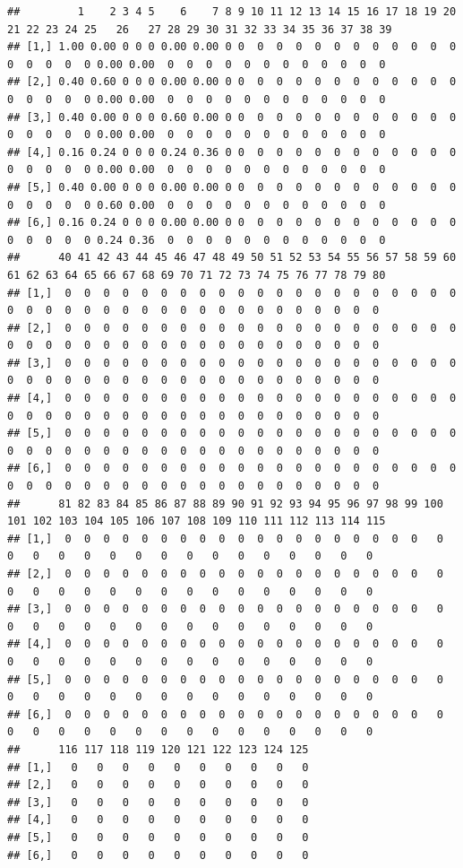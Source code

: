 \documentclass[
]{book}
\begin{document}
\begin{verbatim}
##         1    2 3 4 5    6    7 8 9 10 11 12 13 14 15 16 17 18 19 20 21 22 23 24 25   26   27 28 29 30 31 32 33 34 35 36 37 38 39
## [1,] 1.00 0.00 0 0 0 0.00 0.00 0 0  0  0  0  0  0  0  0  0  0  0  0  0  0  0  0  0 0.00 0.00  0  0  0  0  0  0  0  0  0  0  0  0
## [2,] 0.40 0.60 0 0 0 0.00 0.00 0 0  0  0  0  0  0  0  0  0  0  0  0  0  0  0  0  0 0.00 0.00  0  0  0  0  0  0  0  0  0  0  0  0
## [3,] 0.40 0.00 0 0 0 0.60 0.00 0 0  0  0  0  0  0  0  0  0  0  0  0  0  0  0  0  0 0.00 0.00  0  0  0  0  0  0  0  0  0  0  0  0
## [4,] 0.16 0.24 0 0 0 0.24 0.36 0 0  0  0  0  0  0  0  0  0  0  0  0  0  0  0  0  0 0.00 0.00  0  0  0  0  0  0  0  0  0  0  0  0
## [5,] 0.40 0.00 0 0 0 0.00 0.00 0 0  0  0  0  0  0  0  0  0  0  0  0  0  0  0  0  0 0.60 0.00  0  0  0  0  0  0  0  0  0  0  0  0
## [6,] 0.16 0.24 0 0 0 0.00 0.00 0 0  0  0  0  0  0  0  0  0  0  0  0  0  0  0  0  0 0.24 0.36  0  0  0  0  0  0  0  0  0  0  0  0
##      40 41 42 43 44 45 46 47 48 49 50 51 52 53 54 55 56 57 58 59 60 61 62 63 64 65 66 67 68 69 70 71 72 73 74 75 76 77 78 79 80
## [1,]  0  0  0  0  0  0  0  0  0  0  0  0  0  0  0  0  0  0  0  0  0  0  0  0  0  0  0  0  0  0  0  0  0  0  0  0  0  0  0  0  0
## [2,]  0  0  0  0  0  0  0  0  0  0  0  0  0  0  0  0  0  0  0  0  0  0  0  0  0  0  0  0  0  0  0  0  0  0  0  0  0  0  0  0  0
## [3,]  0  0  0  0  0  0  0  0  0  0  0  0  0  0  0  0  0  0  0  0  0  0  0  0  0  0  0  0  0  0  0  0  0  0  0  0  0  0  0  0  0
## [4,]  0  0  0  0  0  0  0  0  0  0  0  0  0  0  0  0  0  0  0  0  0  0  0  0  0  0  0  0  0  0  0  0  0  0  0  0  0  0  0  0  0
## [5,]  0  0  0  0  0  0  0  0  0  0  0  0  0  0  0  0  0  0  0  0  0  0  0  0  0  0  0  0  0  0  0  0  0  0  0  0  0  0  0  0  0
## [6,]  0  0  0  0  0  0  0  0  0  0  0  0  0  0  0  0  0  0  0  0  0  0  0  0  0  0  0  0  0  0  0  0  0  0  0  0  0  0  0  0  0
##      81 82 83 84 85 86 87 88 89 90 91 92 93 94 95 96 97 98 99 100 101 102 103 104 105 106 107 108 109 110 111 112 113 114 115
## [1,]  0  0  0  0  0  0  0  0  0  0  0  0  0  0  0  0  0  0  0   0   0   0   0   0   0   0   0   0   0   0   0   0   0   0   0
## [2,]  0  0  0  0  0  0  0  0  0  0  0  0  0  0  0  0  0  0  0   0   0   0   0   0   0   0   0   0   0   0   0   0   0   0   0
## [3,]  0  0  0  0  0  0  0  0  0  0  0  0  0  0  0  0  0  0  0   0   0   0   0   0   0   0   0   0   0   0   0   0   0   0   0
## [4,]  0  0  0  0  0  0  0  0  0  0  0  0  0  0  0  0  0  0  0   0   0   0   0   0   0   0   0   0   0   0   0   0   0   0   0
## [5,]  0  0  0  0  0  0  0  0  0  0  0  0  0  0  0  0  0  0  0   0   0   0   0   0   0   0   0   0   0   0   0   0   0   0   0
## [6,]  0  0  0  0  0  0  0  0  0  0  0  0  0  0  0  0  0  0  0   0   0   0   0   0   0   0   0   0   0   0   0   0   0   0   0
##      116 117 118 119 120 121 122 123 124 125
## [1,]   0   0   0   0   0   0   0   0   0   0
## [2,]   0   0   0   0   0   0   0   0   0   0
## [3,]   0   0   0   0   0   0   0   0   0   0
## [4,]   0   0   0   0   0   0   0   0   0   0
## [5,]   0   0   0   0   0   0   0   0   0   0
## [6,]   0   0   0   0   0   0   0   0   0   0
\end{verbatim}
\end{document}
